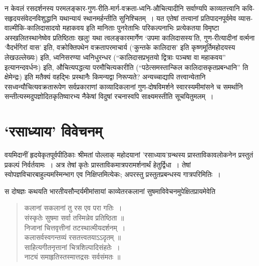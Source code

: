 {\dev न केवलं रसदर्शनस्य परमलङ्कार-गुण-रीति-मार्ग-वक्रता-ध्वनि-औचित्यादीनि सर्वाण्यपि काव्यतत्त्वानि कवि-सहृदयसंवेदनविशुद्धानि यथान्यायं स्थानमर्हन्तीति सुनिश्चितम्~। यत एतेषां तत्त्वानां प्रतिपादनपूर्वमेव व्यास-वाल्मीकि-कालिदासादयो महाकवय इति मानिताः पुनरेताभिः परिकल्पनाभिः प्रत्येकतया विमृष्टा अस्खलितस्थानेष्वेव प्रतिष्ठिताः खलु! यथा त्वलङ्कारमार्गेण `उपमा कालिदासस्य'ति, गुण-रीत्यादीनां वर्त्मना `वैदर्भगिरां वास' इति, वक्रोक्तिपथेन वक्रतापरमाचार्य (`कुन्तके कालिदास' इति कृष्णमूर्तिमहोदयस्य लेख\break उल्लेख्यः) इति, ध्वनिसरण्या ध्वनिधुरन्धर (``कालिदासप्रभृतयो द्वित्राः पञ्चषा वा महाकवय'' इत्यानन्द\-वर्धनः) इति, औचित्यपद्धत्या परमौचित्यकारीति (``पठेत्समस्तान्किल कालिदास\-कृत\-प्रब\-न्धानि'' ति क्षेमेन्द्रः) इति मतैक्यं वहद्भिः प्रस्थानैः किमन्यद्वा निरूप्यते? अन्यच्चाद्यापि तत्त्वान्येतानि रसध्वन्यौचित्यवक्रतारूपेण सर्वप्रकाराणां काव्यादिकलानां गुण-दोषविमर्शने स्वारस्यमीमांसने च समर्थानि सन्तीत्यस्मदुपज्ञोदितकृतिष्वारभ्य नैकेषां विदुषां रचनास्वपि साक्ष्यमस्तीति सूचयितुमलम्~।} 

\section*{{\dev `रसाध्याय' विवेचनम्}}

{\dev वयमिदानीं हृदयेकृतपूर्वपीठिकाः श्रीमतां पोल्लाक् महोदयानां ’रसाध्याय’ग्रन्थस्य प्रास्तावि\-काव\-लोकनेन प्रस्तुतं प्रकल्पं निर्वर्तयामः~। अत्र तेषां कृतेः प्रास्ताविकमात्रपरामर्शनार्थं हेतु\-र्द्विधा~। तेषां स्वोपज्ञविचारबाहुल्यमस्मिन्भाग एव निक्षिप्तमित्येकः; अपरस्तु प्रस्तुतप्रबन्धस्य गात्र\-परिमितिः~।}

{\dev स दोषज्ञः कथयति भारतीयसौन्दर्यमीमांसायां काव्येतरकलानां सुषमाविवेचनमुपेक्षितप्राय\-मेवेति}  
\begin{quote}
{\dev कलानां सकलानां तु रस एव परा गतिः~।}\\
{\dev संस्कृतेः सुषमा सर्वा तस्मिन्नेव प्रतिष्ठिता ॥}\\[5pt]
{\dev निजानां चित्तवृत्तीनां तटस्थात्मीयदर्शनम्~।}\\
{\dev कलासर्वस्वगन्तव्यं रसतत्त्वतयाऽऽदृतम् ॥}\\[5pt]
{\dev साहित्यगीतनृत्तानां चित्रशिल्पादिसंहतेः~।}\\
{\dev नाट्यं समाहृतिस्तस्मात्तद्रसः सर्वसंमतः ॥}
\end{quote}

